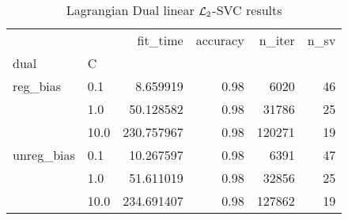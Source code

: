 \begin{table}[H]
\centering
\caption{Lagrangian Dual linear $\protect \mathcal{L}_2$-SVC results}
\label{linear_lagrangian_dual_l2_svc_cv_results}
\begin{tabular}{llrrrr}
\toprule
           &      &    fit\_time &  accuracy &  n\_iter &  n\_sv \\
dual & C &             &           &         &       \\
\midrule
reg\_bias & 0.1  &    8.659919 &      0.98 &    6020 &    46 \\
           & 1.0  &   50.128582 &      0.98 &   31786 &    25 \\
           & 10.0 &  230.757967 &      0.98 &  120271 &    19 \\
unreg\_bias & 0.1  &   10.267597 &      0.98 &    6391 &    47 \\
           & 1.0  &   51.611019 &      0.98 &   32856 &    25 \\
           & 10.0 &  234.691407 &      0.98 &  127862 &    19 \\
\bottomrule
\end{tabular}
\end{table}
